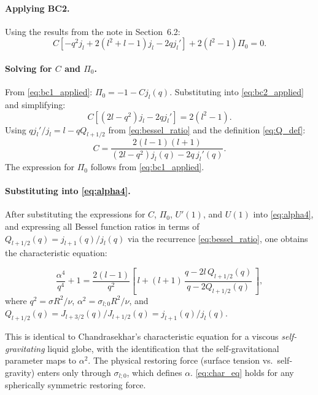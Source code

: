 \documentclass[12pt]{article}
\theoremstyle{definition}
\begin{document}
\paragraph{Applying BC2.}
Using the results from the note in Section~6.2:
\begin{equation}
  C\!\left[-q^2 j_l + 2(l^2+l-1)j_l - 2q j_l'\right] + 2(l^2-1)\Pi_0 = 0.
  \label{eq:bc2_applied}
\end{equation}

\paragraph{Solving for $C$ and $\Pi_0$.}
From \eqref{eq:bc1_applied}: $\Pi_0 = -1 - Cj_l(q)$. Substituting into
\eqref{eq:bc2_applied} and simplifying:
\[
  C\!\left[(2l - q^2)j_l - 2q j_l'\right] = 2(l^2-1).
\]
Using $q j_l'/j_l = l - qQ_{l+1/2}$ from \eqref{eq:bessel_ratio} and the definition
\eqref{eq:Q_def}:
\begin{equation}
  C = \frac{2(l-1)(l+1)}{(2l-q^2)j_l(q) - 2q\,j_l'(q)}.
  \label{eq:C_soln}
\end{equation}
The expression for $\Pi_0$ follows from \eqref{eq:bc1_applied}.

\paragraph{Substituting into \eqref{eq:alpha4}.}
After substituting the expressions for $C$, $\Pi_0$, $U'(1)$, and $U(1)$ into
\eqref{eq:alpha4}, and expressing all Bessel function ratios in terms of
$Q_{l+1/2}(q) = j_{l+1}(q)/j_l(q)$ via the recurrence \eqref{eq:bessel_ratio},
one obtains the characteristic equation:

\begin{keybox}
\begin{equation}
  \frac{\alpha^4}{q^4} + 1
  = \frac{2(l-1)}{q^2}
    \left[\,l + (l+1)\,\frac{q - 2l\,Q_{l+1/2}(q)}{q - 2Q_{l+1/2}(q)}\,\right],
  \label{eq:char_eq}
\end{equation}
where $q^2 = \sigma R^2/\nu$, $\alpha^2 = \sigma_{l;0}R^2/\nu$, and
$Q_{l+1/2}(q) = J_{l+3/2}(q)/J_{l+1/2}(q) = j_{l+1}(q)/j_l(q)$.
\end{keybox}

\begin{notebox}[Universality]
This is identical to Chandrasekhar's characteristic equation for a viscous
\emph{self-gravitating} liquid globe, with the identification that the self-gravitational
parameter maps to $\alpha^2$. The physical restoring force (surface tension vs.\
self-gravity) enters only through $\sigma_{l;0}$, which defines $\alpha$.
\eqref{eq:char_eq} holds for any spherically symmetric restoring force.
\end{notebox}
\end{document}
